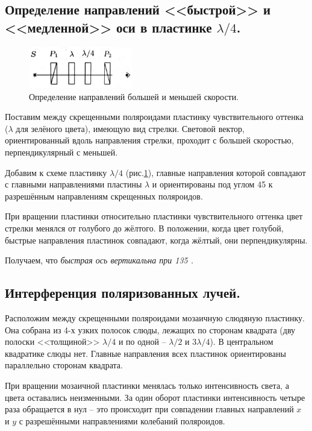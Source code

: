 \documentclass[a4paper, 12pt, twoside]{article}
\begin{document}
\begin{center}
\end{center}

\subsection{Определение направлений <<быстрой>> и <<медленной>> оси в пластинке $\lambda/4$.}

\begin{figure}[H]
	\centering
	\includegraphics[width =  0.4\textwidth]{img4}
	\caption{Определение направлений большей и меньшей скорости.}
	\label{img4}
\end{figure}

Поставим между скрещенными поляроидами пластинку чувствительного оттенка ($\lambda$ для зелёного цвета), имеющую вид стрелки. Световой вектор, ориентированный вдоль направления стрелки, проходит с большей скоростью, перпендикулярный с меньшей.

Добавим к схеме пластинку $\lambda/4$ (рис.\ref{img4}), главные направления которой совпадают с главными направлениями пластины $\lambda$ и ориентированы под углом 45 \degree к разрешённым направлениям скрещенных поляроидов.

При вращении пластинки относительно пластинки чувствительного оттенка цвет стрелки менялся от голубого до жёлтого. В положении, когда цвет голубой, быстрые направления пластинок совпадают, когда жёлтый, они перпендикулярны.

Получаем, что \textit{быстрая ось вертикальна при 135 \degree.}

\subsection{Интерференция поляризованных лучей.}

Расположим между скрещенными поляроидами мозаичную слюдяную пластинку. Она собрана из 4-х узких полосок слюды, лежащих по сторонам квадрата (дву полоски <<толщиной>> $\lambda/4$ и по одной -- $\lambda/2$ и $3\lambda/4$). В центральном квадратике слюды нет. Главные направления всех пластинок ориентированы параллельно сторонам квадрата.

При вращении мозаичной пластинки менялась только интенсивность света, а цвета оставались неизменными. За один оборот пластинки интенсивность четыре раза обращается в нул -- это происходит при совпадении главных направлений $x$ и $y$ с разрешёнными направлениями колебаний поляроидов.
\end{document}
